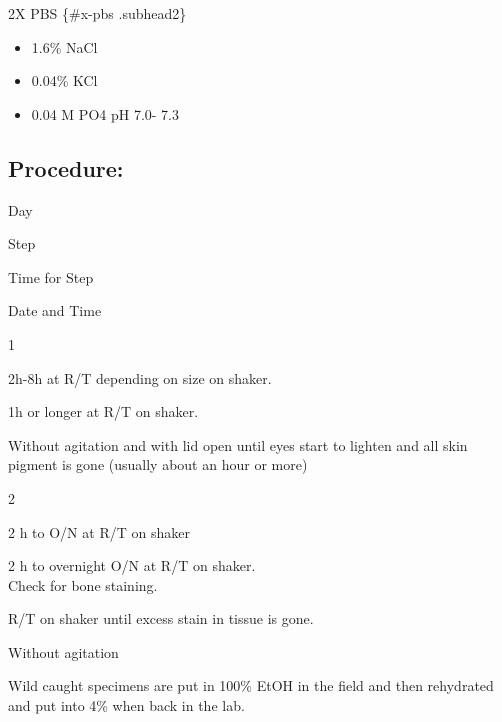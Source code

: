 \documentclass[
]{book}
\providecommand{\tightlist}{%
  \setlength{\itemsep}{0pt}\setlength{\parskip}{0pt}}
\begin{document}
2X PBS \{\#x-pbs .subhead2\}

\begin{itemize}
\tightlist
\item
  1.6\% NaCl
\item
  0.04\% KCl
\item
  0.04 M PO4 pH 7.0- 7.3
\end{itemize}

\hypertarget{procedure}{%
\subsection{Procedure:}\label{procedure}}

Day

Step

Time for Step

Date and Time

1

2h-8h at R/T depending on size on shaker.

1h or longer at R/T on shaker.

Without agitation and with lid open until eyes start to lighten and all
skin pigment is gone (usually about an hour or more)

2

2 h to O/N at R/T on shaker

2 h to overnight O/N at R/T on shaker.\\
Check for bone staining.

R/T on shaker until excess stain in tissue is gone.

Without agitation

Wild caught specimens are put in 100\% EtOH in the field and then
rehydrated and put into 4\% when back in the lab.

  
\end{document}
